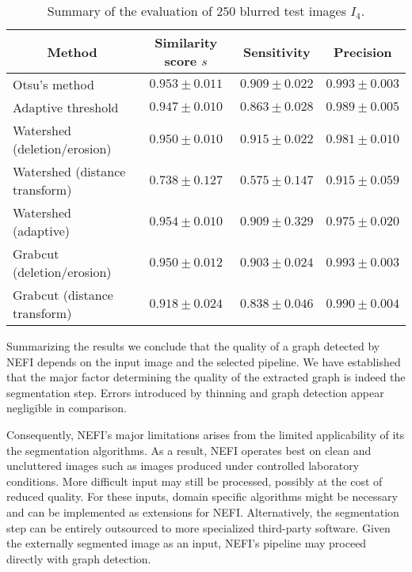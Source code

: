 		\begin{table}
			\centering
			\begin{tabular}{@{} l *3c @{}}
			\toprule
			\multicolumn{1}{c}{Method}    & Similarity score $s$  & Sensitivity  & Precision \\ 
			\midrule
			Otsu's method                   & $0.953 \pm 0.011$ & $0.909 \pm 0.022$ & $0.993 \pm 0.003$ \\
			Adaptive threshold              & $0.947 \pm 0.010$ & $0.863 \pm 0.028$ & $0.989 \pm 0.005$ \\
			Watershed (deletion/erosion)    & $0.950 \pm 0.010$ & $0.915 \pm 0.022$ & $0.981 \pm 0.010$ \\
			Watershed (distance transform)  & $0.738 \pm 0.127$ & $0.575 \pm 0.147$ & $0.915 \pm 0.059$ \\
			Watershed (adaptive)            & $0.954 \pm 0.010$ & $0.909 \pm 0.329$ & $0.975 \pm 0.020$ \\
			Grabcut (deletion/erosion)      & $0.950 \pm 0.012$ & $0.903 \pm 0.024$ & $0.993 \pm 0.003$ \\
			Grabcut (distance transform)    & $0.918 \pm 0.024$ & $0.838 \pm 0.046$ & $0.990 \pm 0.004$ \\
			\bottomrule
			\end{tabular}
			\caption[NEFI's evaluation: Images with a blur]{Summary of the evaluation of $250$ blurred test images $I_4$.}
			\label{tab:blur}
		\end{table}

		Summarizing the results we conclude that the quality of a graph detected by NEFI depends on the input image and the selected pipeline. We have established that the major factor determining the quality of the extracted graph is indeed the segmentation step. Errors introduced by thinning and graph detection appear negligible in comparison. 

		Consequently, NEFI's major limitations arises from the limited applicability of its the segmentation algorithms. As a result, NEFI operates best on clean and uncluttered images such as images produced under controlled laboratory conditions. More difficult input may still be processed, possibly at the cost of reduced quality. For these inputs, domain specific algorithms might be necessary and can be implemented as extensions for NEFI. Alternatively, the segmentation step can be entirely outsourced to more specialized third-party software. Given the externally segmented image as an input, NEFI's pipeline may proceed directly with graph detection.

